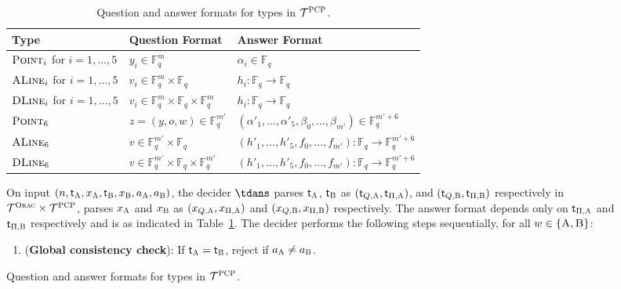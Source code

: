 \documentclass[11pt]{article}
\theoremstyle{definition}
\newcommand{\F}{\ensuremath{\mathbb{F}}}
\newcommand{\type}{\mathcal{T}}
\newcommand{\gamestyle}[1]{\ensuremath{\textsc{#1}}\xspace}
\newcommand{\ora}{\gamestyle{Orac}}
\newcommand{\pcp}{\gamestyle{PCP}}
\newcommand{\labelstyle}[1]{\ensuremath{\textsc{#1}}\xspace}
\newcommand{\tvarstyle}[1]{\mathsf{#1}}
\newcommand{\tvar}{\ensuremath{\tvarstyle{t}}}
\newcommand{\alice}{\labelstyle{A}}
\newcommand{\bob}{\labelstyle{B}}
\newcommand{\typestyle}[1]{\ensuremath{\textsc{#1}}\xspace}
\newcommand{\Point}{\typestyle{Point}}
\newcommand{\ALine}{\typestyle{ALine}}
\newcommand{\DLine}{\typestyle{DLine}}
\newenvironment{gamespec}{
  \begin{mdframed}[style=figstyle]}{
  \end{mdframed}}
\begin{document}
\begin{figure}[!htb]
  \begin{gamespec}
  {
  \small
    \begin{table}[H]
      \centering
      \small
      \begin{tabularx}{\textwidth}{ l l X }
        \toprule
        Type & Question Format & Answer Format \\
        \midrule
        $\Point_i$ for $i=1, \ldots, 5$ & $y_i \in \F_q^m$ &
        $\alpha_i \in \F_q$ \\
        $\ALine_i$ for $i=1, \ldots, 5$ & $v_i \in \F_q^m \times \F_q$ &
        $h_i: \F_q \to \F_q$ \\
        $\DLine_i$ for $i=1, \ldots, 5$ & $v_i \in \F_q^m \times \F_q \times \F_q^m$ &
        $h_i: \F_q \to \F_q$ \\        
        $\Point_6$ & $z = (y, o, w) \in \F_q^{m'}$ & $(\alpha'_1, \ldots,
        \alpha'_5, \beta_0, \ldots, \beta_{m'}) \in \F_q^{m'+6}$\\
        $\ALine_6$ & $v \in \F_q^{m'} \times \F_q$ & $(h'_1, \dots,
        h'_5, f_0, \dots, f_{m'}): \F_q \to \F_q^{m' + 6}$ \\
        $\DLine_6$ & $v \in \F_q^{m'} \times \F_q \times \F_q^{m'}$ & $(h'_1, \dots,
        h'_5, f_0, \dots, f_{m'}): \F_q \to \F_q^{m' + 6}$ \\        
        \bottomrule
      \end{tabularx}
      \caption{Question and answer formats for types in $\type^\pcp$.}\label{table:tpcp}
    \end{table}

    On input $(n, \tvar_\alice, x_\alice, \tvar_\bob, x_\bob, a_\alice,
    a_\bob)$, the decider $\tdans$ parses $\tvar_\alice$, $\tvar_\bob$ as
    $(\tvar_{Q,\alice}, \tvar_{\Pi, \alice})$, and $(\tvar_{Q,\bob},
    \tvar_{\Pi,\bob})$ respectively in $ \type^\ora \times \type^\pcp$, parses
    $x_\alice$ and $x_\bob$ as $(x_{Q,\alice}, x_{\Pi,\alice})$ and
    $(x_{Q,\bob}, x_{\Pi,\bob})$ respectively. The answer format depends only on $\tvar_{\Pi, \alice}$ and $\tvar_{\Pi, \bob}$ respectively and is as indicated in Table~\ref{table:tpcp}.  
    The decider performs the following steps sequentially, for all
    $w\in\{\alice,\bob\}$:
    \begin{enumerate}
    \item (\textbf{Global consistency check}): If $\tvar_{\alice} =
      \tvar_{\bob}$, reject if $a_\alice\neq a_\bob$.
      \label{enu:ar-global-consistency}


\end{enumerate}}
\end{gamespec}
\end{figure}
\end{document}
